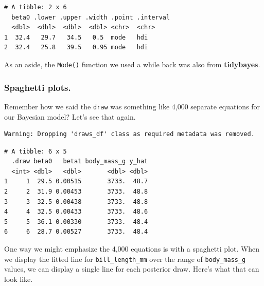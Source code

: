 \documentclass[
  letterpaper,
  DIV=11,
  numbers=noendperiod]{scrartcl}
\newenvironment{Shaded}{\begin{snugshade}}{\end{snugshade}}
\newcommand{\AttributeTok}[1]{\textcolor[rgb]{0.40,0.45,0.13}{#1}}
\newcommand{\CommentTok}[1]{\textcolor[rgb]{0.37,0.37,0.37}{#1}}
\newcommand{\FunctionTok}[1]{\textcolor[rgb]{0.28,0.35,0.67}{#1}}
\newcommand{\NormalTok}[1]{\textcolor[rgb]{0.00,0.23,0.31}{#1}}
\newcommand{\SpecialCharTok}[1]{\textcolor[rgb]{0.37,0.37,0.37}{#1}}
\begin{document}
\begin{verbatim}
# A tibble: 2 x 6
  beta0 .lower .upper .width .point .interval
  <dbl>  <dbl>  <dbl>  <dbl> <chr>  <chr>    
1  32.4   29.7   34.5   0.5  mode   hdi      
2  32.4   25.8   39.5   0.95 mode   hdi      
\end{verbatim}

As an aside, the \texttt{Mode()} function we used a while back was also
from \textbf{tidybayes}.

\subsubsection{Spaghetti plots.}\label{spaghetti-plots.}

Remember how we said the \texttt{draw} was something like 4,000 separate
equations for our Bayesian model? Let's see that again.

\begin{Shaded}
\end{Shaded}

\begin{verbatim}
Warning: Dropping 'draws_df' class as required metadata was removed.
\end{verbatim}

\begin{verbatim}
# A tibble: 6 x 5
  .draw beta0   beta1 body_mass_g y_hat
  <int> <dbl>   <dbl>       <dbl> <dbl>
1     1  29.5 0.00515       3733.  48.7
2     2  31.9 0.00453       3733.  48.8
3     3  32.5 0.00438       3733.  48.8
4     4  32.5 0.00433       3733.  48.6
5     5  36.1 0.00330       3733.  48.4
6     6  28.7 0.00527       3733.  48.4
\end{verbatim}

One way we might emphasize the 4,000 equations is with a spaghetti plot.
When we display the fitted line for \texttt{bill\_length\_mm} over the
range of \texttt{body\_mass\_g} values, we can display a single line for
each posterior draw. Here's what that can look like.
\end{document}
